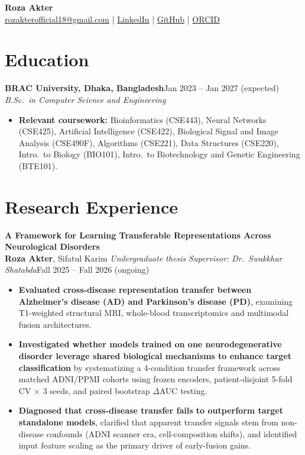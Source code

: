 \documentclass[10pt,letterpaper]{article}
\newcommand{\lnk}[2]{\href{#1}{\textcolor{link}{#2}}}
\newcommand{\entry}[4]{\textbf{#1}\hfill #2\\ \textit{#3}\hfill\textit{#4}\par}
\begin{document}
\begin{center}
{\LARGE\bfseries\color{accent} Roza Akter}\\[4pt]
\lnk{mailto:rozakterofficial18@gmail.com}{rozakterofficial18@gmail.com} \enspace|\enspace
\lnk{https://www.linkedin.com/in/rozaakter/}{LinkedIn} \enspace|\enspace
\lnk{https://github.com/rozakter18}{GitHub} \enspace|\enspace
\lnk{https://orcid.org/0009-0007-3725-3633}{ORCID}
\end{center}

\section{Education}
\entry{BRAC University, Dhaka, Bangladesh}{Jan 2023 -- Jan 2027 (expected)}{B.Sc.\ in Computer Science and Engineering}{}
\begin{itemize}
  \item \textbf{Relevant coursework:} Bioinformatics (CSE443), Neural Networks (CSE425), Artificial Intelligence (CSE422), Biological Signal and Image Analysis (CSE490F), Algorithms (CSE221), Data Structures (CSE220), Intro.\ to Biology (BIO101), Intro.\ to Biotechnology and Genetic Engineering (BTE101).
\end{itemize}

\section{Research Experience}
\textbf{A Framework for Learning Transferable Representations Across Neurological Disorders}\\
\textbf{Roza Akter}, Sifatul Karim \textbar{} \textit{Undergraduate thesis \textbar{} Supervisor: Dr.\ Swakkhar Shatabda}\hfill Fall 2025 -- Fall 2026 (ongoing)\par
\begin{itemize}
  \item \textbf{Evaluated cross-disease representation transfer between Alzheimer's disease (AD) and Parkinson's disease (PD)}, examining T1-weighted structural MRI, whole-blood transcriptomics and multimodal fusion architectures.
  \item \textbf{Investigated whether models trained on one neurodegenerative disorder leverage shared biological mechanisms to enhance target classification} by systematizing a 4-condition transfer framework across matched ADNI/PPMI cohorts using frozen encoders, patient-disjoint 5-fold CV $\times$ 3 seeds, and paired bootstrap $\Delta$AUC testing.
  \item \textbf{Diagnosed that cross-disease transfer fails to outperform target standalone models}, clarified that apparent transfer signals stem from non-disease confounds (ADNI scanner era, cell-composition shifts), and identified input feature scaling as the primary driver of early-fusion gains.
\end{itemize}
\end{document}
